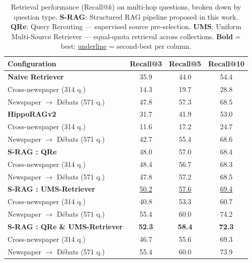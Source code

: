 \begin{table}[ht]
\centering
\caption{Retrieval performance (Recall@$k$) on multi-hop questions, broken down by
question type.
\textbf{S-RAG}: Structured RAG pipeline proposed in this work.
\textbf{QRe}: Query Rerouting — supervised source pre-selection.
\textbf{UMS}: Uniform Multi-Source Retriever — equal-quota retrieval across collections.
\textbf{Bold} = best; \underline{underline} = second-best per column.}
\label{tab:retrieval-results}
\small
\setlength{\tabcolsep}{0pt}
\begin{tabular*}{\textwidth}{@{\extracolsep{\fill}} l ccc @{}}
\toprule
\textbf{Configuration}
  & \textbf{Recall@3}
  & \textbf{Recall@5}
  & \textbf{Recall@10} \\
\midrule

\rowcolor{sectiongray}
\textbf{Naive Retriever} \cite{historiqa} & 35.9 & 44.0 & 54.4 \\
\quad Cross-newspaper (314 q.)            & 14.3 & 19.7 & 28.8 \\
\quad Newspaper $\rightarrow$ Débats (571 q.) & 47.8 & 57.3 & 68.5 \\

\midrule
\rowcolor{sectiongray}
\textbf{HippoRAGv2} \cite{hipporagv2}       & 31.7 & 41.9 & 53.0 \\
\quad Cross-newspaper (314 q.)            & 11.6 & 17.2 & 24.7 \\
\quad Newspaper $\rightarrow$ Débats (571 q.) & 42.7 & 55.4 & 68.6 \\

\midrule
\rowcolor{sectiongray}
\textbf{S-RAG : QRe}                     & 48.0 & 57.0 & 68.4 \\
\quad Cross-newspaper (314 q.)            & 48.4 & 56.7 & 68.3 \\
\quad Newspaper $\rightarrow$ Débats (571 q.) & 47.8 & 57.2 & 68.5 \\

\rowcolor{sectiongray}
\textbf{S-RAG : UMS-Retriever}           & \underline{50.2} & \underline{57.6} & \underline{69.4} \\
\quad Cross-newspaper (314 q.)            & 40.8 & 53.3 & 60.7 \\
\quad Newspaper $\rightarrow$ Débats (571 q.) & 55.4 & 60.0 & 74.2 \\

\midrule
\rowcolor{sectiongray}
\textbf{S-RAG : QRe \& UMS-Retriever}   & \textbf{52.3} & \textbf{58.4} & \textbf{72.3} \\
\quad Cross-newspaper (314 q.)            & 46.7 & 55.6 & 69.3 \\
\quad Newspaper $\rightarrow$ Débats (571 q.) & 55.4 & 60.0 & 73.9 \\

\bottomrule
\end{tabular*}
\end{table}

